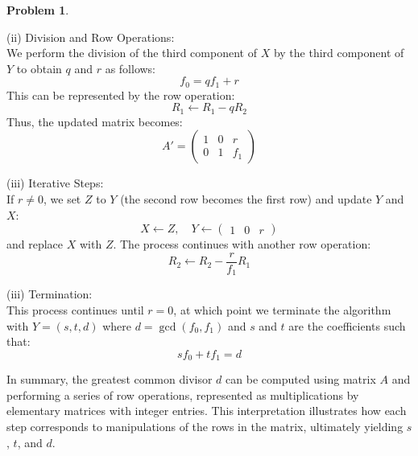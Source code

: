 \documentclass[12pt]{article}
\theoremstyle{definition}
\newtheorem{problem}{Problem}
\begin{document}
\begin{problem}
\begin{solution}
        (ii) Division and Row Operations:\\
        We perform the division of the third component of \(X\) by the third component of \(Y\) to obtain \(q\) and \(r\) as follows:
        \[
        f_0 = q f_1 + r
        \]
        This can be represented by the row operation:
        \[
        R_1 \leftarrow R_1 - q R_2
        \]
        Thus, the updated matrix becomes:
        \[
        A' = \begin{pmatrix}
        1 & 0 & r \\
        0 & 1 & f_1
        \end{pmatrix}
        \]

        (iii) Iterative Steps:\\
        If \(r \neq 0\), we set \(Z\) to \(Y\) (the second row becomes the first row) and update \(Y\) and \(X\):
        \[
        X \leftarrow Z, \quad Y \leftarrow \begin{pmatrix} 1 & 0 & r \end{pmatrix}
        \]
        and replace \(X\) with \(Z\). The process continues with another row operation:
        \[
        R_2 \leftarrow R_2 - \frac{r}{f_1} R_1
        \]

        (iii) Termination:\\
        This process continues until \(r = 0\), at which point we terminate the algorithm with \(Y = (s, t, d)\) where \(d = \gcd(f_0, f_1)\) and \(s\) and \(t\) are the coefficients such that:
        \[
        s f_0 + t f_1 = d
        \]

        In summary, the greatest common divisor \(d\) can be computed using matrix \(A\) and performing a series of row operations, represented as multiplications by elementary matrices with integer entries. This interpretation illustrates how each step corresponds to manipulations of the rows in the matrix, ultimately yielding \(s\), \(t\), and \(d\).


    \end{solution}

\end{problem}
\end{document}
